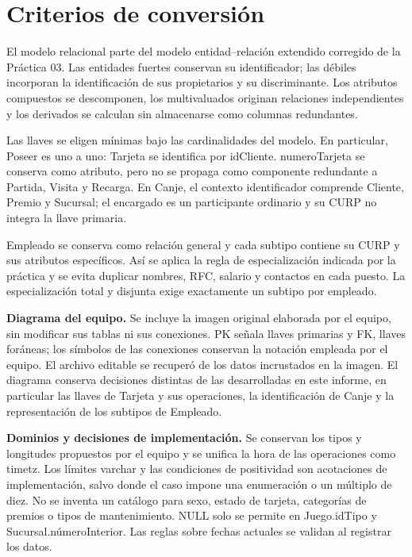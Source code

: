\documentclass[11pt]{article}
\begin{document}
\tableofcontents\clearpage
\section*{Criterios de conversión}
El modelo relacional parte del modelo entidad--relación extendido corregido de la Práctica 03. Las entidades fuertes conservan su identificador; las débiles incorporan la identificación de sus propietarios y su discriminante. Los atributos compuestos se descomponen, los multivaluados originan relaciones independientes y los derivados se calculan sin almacenarse como columnas redundantes.

Las llaves se eligen mínimas bajo las cardinalidades del modelo. En particular, Poseer es uno a uno: Tarjeta se identifica por idCliente. numeroTarjeta se conserva como atributo, pero no se propaga como componente redundante a Partida, Visita y Recarga. En Canje, el contexto identificador comprende Cliente, Premio y Sucursal; el encargado es un participante ordinario y su CURP no integra la llave primaria.

Empleado se conserva como relación general y cada subtipo contiene su CURP y sus atributos específicos. Así se aplica la regla de especialización indicada por la práctica y se evita duplicar nombres, RFC, salario y contactos en cada puesto. La especialización total y disjunta exige exactamente un subtipo por empleado.

\textbf{Diagrama del equipo.} Se incluye la imagen original elaborada por el equipo, sin modificar sus tablas ni sus conexiones. PK señala llaves primarias y FK, llaves foráneas; los símbolos de las conexiones conservan la notación empleada por el equipo. El archivo editable se recuperó de los datos incrustados en la imagen. El diagrama conserva decisiones distintas de las desarrolladas en este informe, en particular las llaves de Tarjeta y sus operaciones, la identificación de Canje y la representación de los subtipos de Empleado.

\textbf{Dominios y decisiones de implementación.} Se conservan los tipos y longitudes propuestos por el equipo y se unifica la hora de las operaciones como timetz. Los límites varchar y las condiciones de positividad son acotaciones de implementación, salvo donde el caso impone una enumeración o un múltiplo de diez. No se inventa un catálogo para sexo, estado de tarjeta, categorías de premios o tipos de mantenimiento. NULL solo se permite en Juego.idTipo y Sucursal.númeroInterior. Las reglas sobre fechas actuales se validan al registrar los datos.
\end{document}
